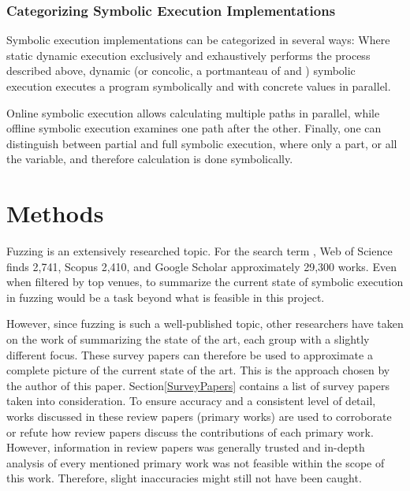 \documentclass{article}
\begin{document}
\begin{multicols}{2}
    \subsubsection{Categorizing Symbolic Execution Implementations}
    Symbolic execution implementations can be categorized in several ways: Where static dynamic execution exclusively and exhaustively performs the process described above, dynamic (or concolic, a portmanteau of  and ) symbolic execution executes a program symbolically and with concrete values in parallel.

    Online symbolic execution allows calculating multiple paths in parallel, while offline symbolic execution examines one path after the other. Finally, one can distinguish between partial and full symbolic execution, where only a part, or all the variable, and therefore calculation is done symbolically.\cite{Ghidrion}

    \section{Methods}
    \label{Methods}
    Fuzzing is an extensively researched topic. For the search term , Web of Science\cite{WebOfScience} finds 2,741, Scopus\cite{Scopus} 2,410, and Google Scholar\cite{GoogleScholar} approximately 29,300 works. Even when filtered by top venues, to summarize the current state of symbolic execution in fuzzing would be a task beyond what is feasible in this project.

    However, since fuzzing is such a well-published topic, other researchers have taken on the work of summarizing the state of the art, each group with a slightly different focus. These survey papers can therefore be used to approximate a complete picture of the current state of the art. This is the approach chosen by the author of this paper. Section\ref{SurveyPapers} contains a list of survey papers taken into consideration. To ensure accuracy and a consistent level of detail, works discussed in these review papers (primary works) are used to corroborate or refute how review papers discuss the contributions of each primary work. However, information in review papers was generally trusted and in-depth analysis of every mentioned primary work was not feasible within the scope of this work. Therefore, slight inaccuracies might still not have been caught.


\end{multicols}
\end{document}
